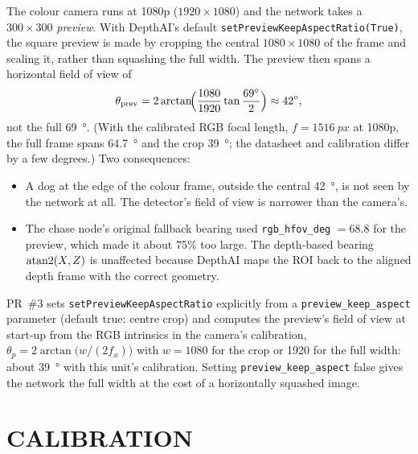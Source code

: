 The colour camera runs at 1080p ($1920\times1080$) and the network takes a
$300\times300$ \emph{preview}. With DepthAI's default
\texttt{setPreviewKeepAspectRatio(True)}, the square preview is made by
cropping the central $1080\times1080$ of the frame and scaling it, rather
than squashing the full width. The preview then spans a horizontal field of
view of
\begin{equation}\label{eq:cropfov}
\theta_{\mathrm{prev}}=2\arctan\!\Bigl(\frac{1080}{1920}\tan\frac{\SI{69}{\degree}}{2}\Bigr)
\approx\SI{42}{\degree},
\end{equation}
not the full \SI{69}{\degree}. (With the calibrated RGB focal length,
$f=\SI{1516}{px}$ at 1080p, the full frame spans \SI{64.7}{\degree} and the
crop \SI{39}{\degree}; the datasheet and calibration differ by a few degrees.) Two consequences:
\begin{itemize}
\item A dog at the edge of the colour frame, outside the central
  \SI{42}{\degree}, is not seen by the network at all. The detector's field
  of view is narrower than the camera's.
\item The chase node's original fallback bearing used
  \texttt{rgb\_hfov\_deg} $=68.8$ for the preview, which made it about 75\%
  too large. The depth-based bearing $\operatorname{atan2}(X,Z)$ is unaffected because
  DepthAI maps the ROI back to the aligned depth frame with the correct
  geometry.
\end{itemize}
PR~\#3 sets \texttt{setPreviewKeepAspectRatio} explicitly from a
\texttt{preview\_keep\_aspect} parameter (default true: centre crop) and
computes the preview's field of view at start-up from the RGB intrinsics in
the camera's calibration, $\theta_p=2\arctan\bigl(w/(2f_x)\bigr)$ with
$w=1080$ for the crop or 1920 for the full width: about \SI{39}{\degree} with
this unit's calibration. Setting \texttt{preview\_keep\_aspect} false gives the
network the full width at the cost of a horizontally squashed image.

\section{CALIBRATION}
\label{sec:oakcal}

